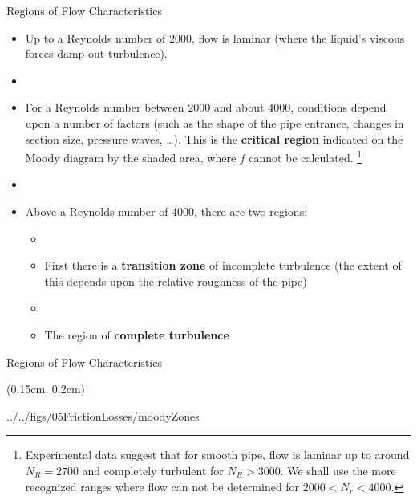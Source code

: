 \documentclass[9pt,xcolor=x11names,professionalfonts, mathserif]{beamer}
\begin{document}
\begin{frame}{Regions of Flow Characteristics} 
	\begin{mini}{
		\begin{itemize}
		  \item Up to a Reynolds number of $2000$, flow is laminar \newline(where the liquid's viscous forces damp out turbulence).
		  \item[]
		  \item For a Reynolds number between $2000$ and about $4000$, conditions depend upon a number of factors (such as the
		   shape of the pipe entrance, changes in section size, pressure waves, \ldots). This is the \textbf{critical region} indicated
		   on the Moody diagram by the shaded area, where $f$ cannot be calculated.
		   \footnote{Experimental data suggest that for smooth pipe, flow is laminar up to around $N_R=2700$ and completely
		   turbulent for $N_R > 3000$. We shall use the more recognized ranges where flow can not be determined for $2000 <
		   N_r < 4000$.} 
		   \item []
		  \item Above a Reynolds number of $4000$, there are two regions:

		  \begin{itemize}
		    \item []
		    \item First there is a \textbf{transition zone} of incomplete turbulence (the extent of this depends upon the relative roughness of
		    the pipe)
		    \item []
		    \item The region of \textbf{complete turbulence}
		   \end{itemize}
		 \end{itemize}
		}\end{mini}
\end{frame}


\begin{frame}{Regions of Flow Characteristics}
	\begin{textblock*}{1\columnwidth}(0.15cm, 0.2cm)
		\begin{cfig}[0.6]{../../figs/05FrictionLosses/moodyZones}\end{cfig}
	\end{textblock*}
\end{frame}
\end{document}
